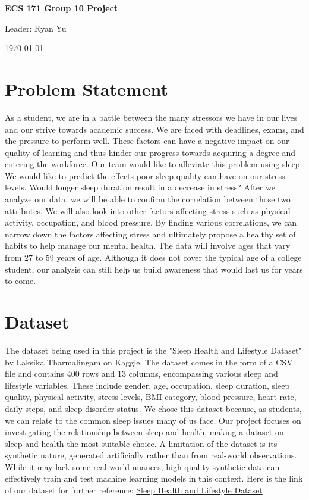 \documentclass[11pt, letterpaper]{article}
\renewcommand{\maketitle}{
    \begin{titlepage}
        \centering
        \huge{\textbf{ECS 171 Group 10 Project}} \par
        \vspace{.5cm}
        \large{Leader: Ryan Yu} \par
        \vspace{.5cm}
        \normalfont{Amira Basyouni, Calvin Chen, Alexis Lydon, Tianming Tan} \par
        \vspace{.5cm}
        \today
    \end{titlepage}
}
\begin{document}
    \maketitle
    
    \newpage

    \section*{Problem Statement}
    As a student, we are in a battle between the many stressors we have in our lives 
    and our strive towards academic success. We are faced with deadlines, exams, and 
    the pressure to perform well. These factors can have a negative impact on our 
    quality of learning and thus hinder our progress towards acquiring a degree and 
    entering the workforce. Our team would like to alleviate this problem using sleep. 
    We would like to predict the effects poor sleep quality can have on our stress 
    levels. Would longer sleep duration result in a decrease in stress? After we 
    analyze our data, we will be able to confirm the correlation between those two 
    attributes. We will also look into other factors affecting stress such as physical 
    activity, occupation, and blood pressure. By finding various correlations, we can 
    narrow down the factors affecting stress and ultimately propose a healthy set of 
    habits to help manage our mental health. The data will involve ages that vary from 
    27 to 59 years of age. Although it does not cover the typical age of a college 
    student, our analysis can still help us build awareness that would last us for 
    years to come.

    \section*{Dataset}
    The dataset being used in this project is the "Sleep Health and Lifestyle Dataset" 
    by Laksika Tharmalingam on Kaggle. The dataset comes in the form of a CSV file and 
    contains 400 rows and 13 columns, encompassing various sleep and lifestyle variables. 
    These include gender, age, occupation, sleep duration, sleep quality, physical 
    activity, stress levels, BMI category, blood pressure, heart rate, daily steps, 
    and sleep disorder status. We chose this dataset because, as students, we can 
    relate to the common sleep issues many of us face. Our project focuses on 
    investigating the relationship between sleep and health, making a dataset on 
    sleep and health the most suitable choice. A limitation of the dataset is its 
    synthetic nature, generated artificially rather than from real-world observations. 
    While it may lack some real-world nuances, high-quality synthetic data can 
    effectively train and test machine learning models in this context. Here is the link
     of our dataset for further reference: \href{https://www.kaggle.com/datasets/uom190346a/sleep-health-and-lifestyle-dataset/data}{Sleep Health and Lifestyle Dataset}
    
\end{document}

